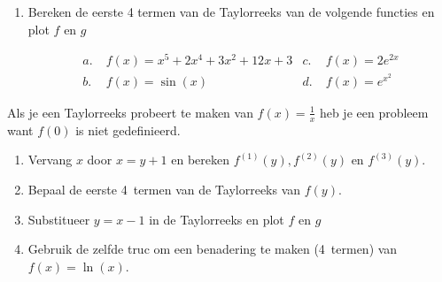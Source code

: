 \documentclass[../main.tex]{subfiles}
\begin{document}
\begin{opdracht}
\begin{enumerate}
    \item Bereken de eerste 4 termen van de Taylorreeks van de volgende functies en plot $f$ en $g$

     \begin{align*}
        a.\;& f(x)=x^5+2x^4+3x^2+12x+3
        & c.\;& f(x)=2e^{2x}\\
        b.\;& f(x)=\sin(x)
        & d.\;& f(x)=e^{x^2}
    \end{align*}
\end{enumerate}
Als je een Taylorreeks probeert te maken van $f(x)=\frac{1}{x}$ heb je een probleem want $f(0)$ is niet gedefinieerd.
\begin{enumerate}[resume]
    \item Vervang $x$ door $x=y+1$ en bereken $f^{(1)}(y),f^{(2)}(y)$ en $f^{(3)}(y)$.
    \item Bepaal de eerste 4~termen van de Taylorreeks van $f(y)$.\\
    \item Substitueer $y=x-1$ in de Taylorreeks en plot $f$ en $g$\\
    \item Gebruik de zelfde truc om een benadering te maken (4~termen) van $f(x)=\ln(x)$.
\end{enumerate}
\end{opdracht}
\end{document}
